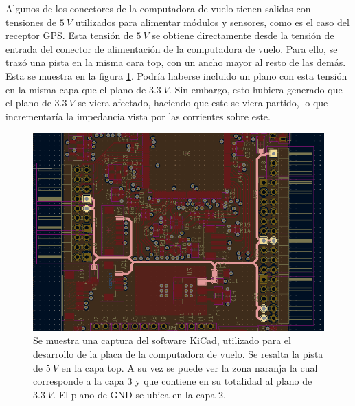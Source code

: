 
Algunos de los conectores de la computadora de vuelo tienen salidas con tensiones de $5 \ V$ utilizados para alimentar módulos y sensores, como es el caso del receptor GPS. Esta tensión de $5 \ V$ se obtiene directamente desde la tensión de entrada del conector de alimentación de la computadora de vuelo. Para ello, se trazó una pista en la misma cara top, con un ancho mayor al resto de las demás. Esta se muestra en la figura \ref{fig:pista_5V}. Podría haberse incluido un plano con esta tensión en la misma capa que el plano de $3.3 \ V$. Sin embargo, esto hubiera generado que el plano de $3.3 \ V$ se viera afectado, haciendo que este se viera partido, lo que incrementaría la impedancia vista por las corrientes sobre este.

\begin{figure}[H]
    \centering
    \includegraphics[width=\textwidth]{img/pista_5V.png}
    \caption{Se muestra una captura del software KiCad, utilizado para el desarrollo de la placa de la computadora de vuelo. Se resalta la pista de $5 \ V$ en la capa top. A su vez se puede ver la zona naranja la cual corresponde a la capa 3 y que contiene en su totalidad al plano de $3.3 \ V$. El plano de GND se ubica en la capa 2.}
    \label{fig:pista_5V}
\end{figure}





